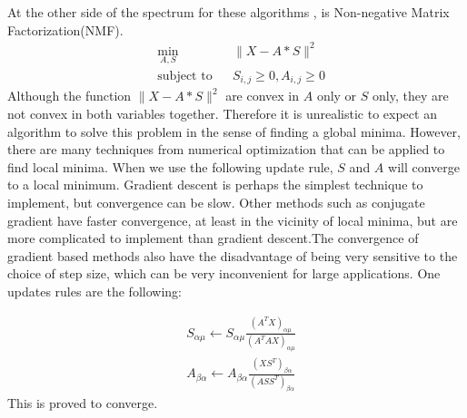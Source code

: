 \documentclass[14pt]{book}
\begin{document}
\par At the other side of the spectrum for these algorithms , is Non-negative Matrix Factorization(NMF). 
\begin{equation}
\begin{aligned}
& \underset{A,S}{\text{min}}
& & \parallel X-A*S \parallel ^2   \\
& \text{subject to}
& & S_{i,j}\geq 0,A_{i,j}\geq 0
\end{aligned}
\end{equation}
\setcounter{chapter}{2}
\setcounter{equation}{0} %
Although the function $ \parallel X-A*S \parallel ^2 $ are convex in $A$ only or $S$ only, they are not convex in both variables together. Therefore it is unrealistic to expect an algorithm to solve this problem in the sense of finding a global minima. However, there are many techniques from numerical optimization that can be applied to find local minima.
When we use the following update rule, $S$ and $A$ will converge to a local minimum. Gradient descent is perhaps the simplest technique to implement, but convergence can be slow. Other methods such as conjugate gradient have faster convergence, at least in the vicinity of local minima, but are more complicated to implement than gradient descent.The convergence of gradient based methods also have the disadvantage of being very sensitive to the choice of step size, which can be very inconvenient for large applications. One updates rules are the following:

\begin{equation}
\begin{aligned}
& S_{\alpha \mu }\leftarrow S_{\alpha \mu }\frac{(A^{T}X)_{\alpha \mu }}{(A^{T}AX)_{\alpha \mu }} \\
& A_{\beta \alpha }\leftarrow A_{\beta \alpha }\frac{(XS^{T})_{\beta \alpha }}{(ASS^{T})_{\beta \alpha }} 
\end{aligned}
\end{equation}
This is proved to converge. 
\end{document}
